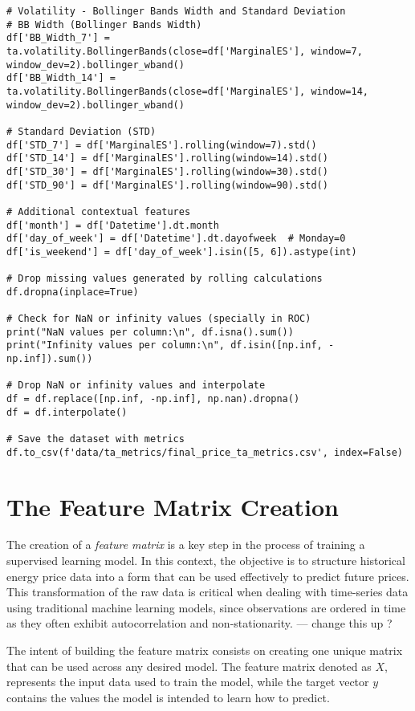 \documentclass[12pt]{report} %
\begin{document}
\begin{lstlisting}
# Volatility - Bollinger Bands Width and Standard Deviation
# BB Width (Bollinger Bands Width)
df['BB_Width_7'] = ta.volatility.BollingerBands(close=df['MarginalES'], window=7, window_dev=2).bollinger_wband()
df['BB_Width_14'] = ta.volatility.BollingerBands(close=df['MarginalES'], window=14, window_dev=2).bollinger_wband()

# Standard Deviation (STD)
df['STD_7'] = df['MarginalES'].rolling(window=7).std()
df['STD_14'] = df['MarginalES'].rolling(window=14).std()
df['STD_30'] = df['MarginalES'].rolling(window=30).std()
df['STD_90'] = df['MarginalES'].rolling(window=90).std()

# Additional contextual features
df['month'] = df['Datetime'].dt.month
df['day_of_week'] = df['Datetime'].dt.dayofweek  # Monday=0
df['is_weekend'] = df['day_of_week'].isin([5, 6]).astype(int)

# Drop missing values generated by rolling calculations
df.dropna(inplace=True)

# Check for NaN or infinity values (specially in ROC)
print("NaN values per column:\n", df.isna().sum())
print("Infinity values per column:\n", df.isin([np.inf, -np.inf]).sum())

# Drop NaN or infinity values and interpolate
df = df.replace([np.inf, -np.inf], np.nan).dropna()
df = df.interpolate()

# Save the dataset with metrics
df.to_csv(f'data/ta_metrics/final_price_ta_metrics.csv', index=False)
\end{lstlisting}


\section{The Feature Matrix Creation}

The creation of a \textit{feature matrix} is a key step in the process of training a supervised learning model. In this context, the objective is to structure historical energy price data into a form that can be used effectively to predict future prices. This transformation of the raw data is critical when dealing with time-series data using traditional machine learning models, since observations are ordered in time as they often exhibit autocorrelation and non-stationarity. --- change this up ?

The intent of building the feature matrix consists on creating one unique matrix that can be used across any desired model. The feature matrix denoted as $\mathit{X}$, represents the input data used to train the model, while the target vector $\mathit{y}$ contains the values the model is intended to learn how to predict.
\end{document}
